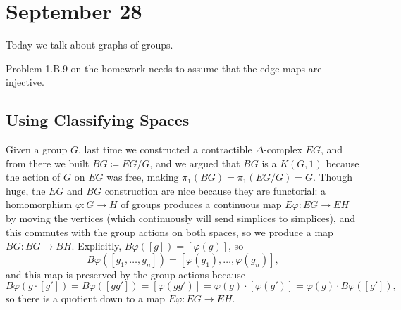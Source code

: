 \documentclass[../notes.tex]{subfiles}
\begin{document}
\section{September 28}

Today we talk about graphs of groups.
\begin{remark}
	Problem 1.B.9 on the homework needs to assume that the edge maps are injective.
\end{remark}

\subsection{Using
 Classifying Spaces}
Given a group $G$, last time we constructed a contractible $\Delta$-complex $EG$, and from there we built $BG\coloneqq EG/G$, and we argued that $BG$ is a $K(G,1)$ because the action of $G$ on $EG$ was free, making $\pi_1(BG)=\pi_1(EG/G)=G$. Though huge, the $EG$ and $BG$ construction are nice because they are functorial: a homomorphism $\varphi\colon G\to H$ of groups produces a continuous map $E\varphi\colon EG\to EH$ by moving the vertices (which continuously will send simplices to simplices), and this commutes with the group actions on both spaces, so we produce a map $BG\colon BG\to BH$. Explicitly, $B\varphi([g])=[\varphi(g)]$, so
\[B\varphi([g_1,\ldots,g_n])=[\varphi(g_1),\ldots,\varphi(g_n)],\]
and this map is preserved by the group actions because
\[B\varphi(g\cdot[g'])=B\varphi([gg'])=[\varphi(gg')]=\varphi(g)\cdot[\varphi(g')]=\varphi(g)\cdot B\varphi([g']),\]
so there is a quotient down to a map $E\varphi\colon EG\to EH$.
\end{document}
